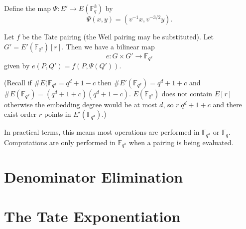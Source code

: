 Define the map $\Psi:E'\rightarrow E(\mathbb{F}_q^k)$ by
\[ \Psi(x,y) = (v^{-1}x, v^{-3/2}y) . \]

Let $f$ be the Tate pairing (the Weil pairing may be substituted).
Let $G' = E'(\mathbb{F}_{q^d})[r]$. Then we have a bilinear map
\[ e : G \times G' \rightarrow \mathbb{F}_{q^k} \]
given by $e(P, Q') = f(P, \Psi(Q'))$.

(Recall if $\#E(\mathbb{F}_{q^d} = q^d + 1 - c$ then
$\#E'(\mathbb{F}_{q^d}) = q^d + 1 + c$ and
$\#E(\mathbb{F}_{q^k}) = (q^{d} + 1 + c)(q^{d} + 1 - c)$.
$E(\mathbb{F}_{q^d})$ does not contain $E[r]$ otherwise the embedding
degree would be at most $d$, so $r | q^{d} + 1 + c$ and
there exist order $r$ points in $E'(\mathbb{F}_{q^d})$.)

In practical terms, this means most operations are performed in
$\mathbb{F}_{q^d}$  or $\mathbb{F}_q$. Computations are only performed in
$\mathbb{F}_{q^k}$ when a pairing is being evaluated.

\section {Denominator Elimination}
\section {The Tate Exponentiation}

